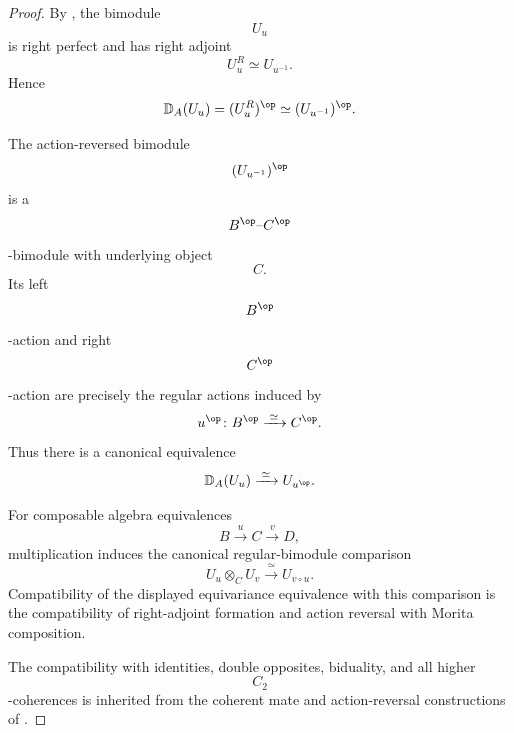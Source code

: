 \begin{proof}
By
,
the bimodule
\[
    U_u
\]
is right perfect and has right adjoint
\[
    U_u^R
    \simeq
    U_{u^{-1}}.
\]
Hence
\[
    \mathbb D_A(U_u)
    =
    (U_u^R)^{\op}
    \simeq
    (U_{u^{-1}})^{\op}.
\]

The action-reversed bimodule
\[
    (U_{u^{-1}})^{\op}
\]
is a
\[
    B^{\op}
    \text{--}
    C^{\op}
\]
-bimodule with underlying object
\[
    C.
\]
Its left
\[
    B^{\op}
\]
-action and right
\[
    C^{\op}
\]
-action are precisely the regular actions induced by
\[
    u^{\op}
    \colon
    B^{\op}
    \xrightarrow{\;\simeq\;}
    C^{\op}.
\]
Thus there is a canonical equivalence
\[
    \mathbb D_A(U_u)
    \xrightarrow{\;\simeq\;}
    U_{u^{\op}}.
\]

For composable algebra equivalences
\[
    B
    \xrightarrow{u}
    C
    \xrightarrow{v}
    D,
\]
multiplication induces the canonical regular-bimodule comparison
\[
    U_u\otimes_CU_v
    \xrightarrow{\;\simeq\;}
    U_{v\circ u}.
\]
Compatibility of the displayed equivariance equivalence with this
comparison is the compatibility of right-adjoint formation and action
reversal with Morita composition.

The compatibility with identities, double opposites, biduality, and all
higher
\[
    C_2
\]
-coherences is inherited from the coherent mate and action-reversal
constructions of
.
\end{proof}

